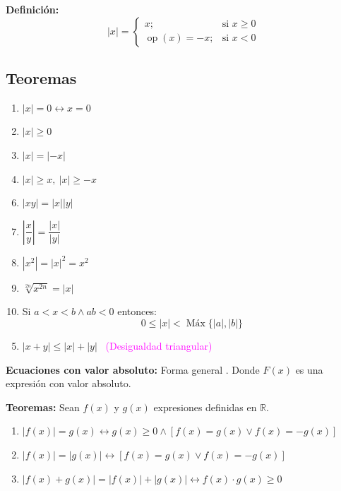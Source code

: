\documentclass[11pt,a4paper]{article}
\newcommand{\cn}[1]{\raisebox{.5pt}{\textcircled{\raisebox{-.9pt}{\scriptsize #1}}}}
\begin{document}
\textbf{Definición:}
\[
|x| = \begin{cases}
x; & \text{si } x \geq 0\\
\operatorname{op}(x) = -x; & \text{si } x < 0
\end{cases}
\]

\subsection*{Teoremas}
\begin{minipage}[t]{0.320\textwidth}
\begin{enumerate}[label=\cn{\arabic*}]
  \item $|x| = 0 \longleftrightarrow x = 0$
  \item $|x| \geq 0$
  \item $|x| = |-x|$
  \item $|x| \geq x,\ |x| \geq -x$
\end{enumerate}
\end{minipage}\hfill
\begin{minipage}[t]{0.291\textwidth}
\begin{enumerate}[label=\cn{\arabic*}]\setcounter{enumi}{5}
  \item $|xy| = |x||y|$
  \item $\left|\dfrac{x}{y}\right| = \dfrac{|x|}{|y|}$
  \item $|x^2| = |x|^2 = x^2$
  \item $\sqrt[2n]{x^{2n}} = |x|$
\end{enumerate}
\end{minipage}\hfill
\begin{minipage}[t]{0.359\textwidth}
\begin{enumerate}[label=\cn{\arabic*}]\setcounter{enumi}{9}
  \item Si $a < x < b \wedge ab < 0$ entonces:
  \[0 \leq |x| < \operatorname{Máx}\{|a|, |b|\}\]
\end{enumerate}
\end{minipage}
\begin{enumerate}[label=\cn{\arabic*}]\setcounter{enumi}{4}
  \item $|x + y| \leq |x| + |y|$ \ \textcolor{magenta}{(Desigualdad triangular)}
\end{enumerate}

\textbf{Ecuaciones con valor absoluto:} Forma general . Donde $F(x)$ es una
expresión con valor absoluto.

\textcolor{naranja}{\textbf{Teoremas:}} Sean $f(x)$ y $g(x)$ expresiones definidas en $\mathbb{R}$.
\begin{enumerate}[label=\cn{\arabic*}]
  \item $|f(x)| = g(x) \longleftrightarrow g(x) \geq 0 \wedge [f(x) = g(x) \vee f(x) = -g(x)]$
  \item $|f(x)| = |g(x)| \longleftrightarrow [f(x) = g(x) \vee f(x) = -g(x)]$
  \item $|f(x) + g(x)| = |f(x)| + |g(x)| \longleftrightarrow f(x)\cdot g(x) \geq 0$
\end{enumerate}
\end{document}

